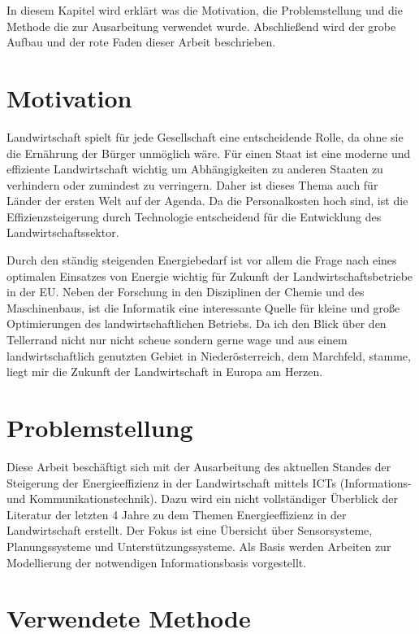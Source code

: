 In diesem Kapitel wird erklärt was die Motivation, die Problemstellung und die Methode die zur Ausarbeitung verwendet wurde. Abschließend wird der grobe Aufbau und der rote Faden dieser Arbeit beschrieben. 

\section{Motivation}

Landwirtschaft spielt für jede Gesellschaft eine entscheidende Rolle, da ohne sie die Ernährung der Bürger unmöglich wäre. Für einen Staat ist eine moderne und effiziente Landwirtschaft wichtig um Abhängigkeiten zu anderen Staaten zu verhindern oder zumindest zu verringern. Daher ist dieses Thema auch für Länder der ersten Welt auf der Agenda. Da die Personalkosten hoch sind, ist die Effizienzsteigerung durch Technologie entscheidend für die Entwicklung des Landwirtschaftssektor.

Durch den ständig steigenden Energiebedarf ist vor allem die Frage nach eines optimalen Einsatzes von Energie wichtig für Zukunft der Landwirtschaftsbetriebe in der EU. Neben der Forschung in den Disziplinen der Chemie und des Maschinenbaus, ist die Informatik eine interessante Quelle für kleine und große Optimierungen des landwirtschaftlichen Betriebs. Da ich den Blick über den Tellerrand nicht nur nicht scheue sondern gerne wage und aus einem landwirtschaftlich genutzten Gebiet in Niederösterreich, dem Marchfeld, stamme, liegt mir die Zukunft der Landwirtschaft in Europa am Herzen.

\section{Problemstellung}

Diese Arbeit beschäftigt sich mit der Ausarbeitung des aktuellen Standes der Steigerung der Energieeffizienz in der Landwirtschaft mittels ICTs (Informations- und Kommunikationstechnik). Dazu wird ein nicht vollständiger Überblick der Literatur der letzten 4 Jahre zu dem Themen Energieeffizienz in der Landwirtschaft erstellt. Der Fokus ist eine Übersicht über Sensorsysteme, Planungssysteme und Unterstützungssysteme. Als Basis werden Arbeiten zur Modellierung der notwendigen Informationsbasis vorgestellt.

\section{Verwendete Methode}

